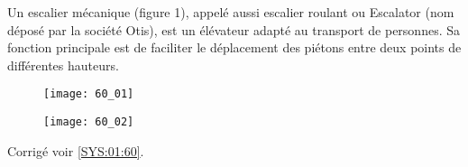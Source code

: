 \normaltrue \difficilefalse \tdifficilefalse
\correctionfalse

\setcounter{question}{0}

\ifcorrection
\else
{}
\fi

\ifprof
\else


Un escalier mécanique (figure 1), appelé aussi escalier roulant ou Escalator (nom déposé par la société Otis), est un élévateur adapté au transport de personnes. Sa fonction principale est de faciliter le déplacement des piétons entre deux points de différentes hauteurs. 



\begin{figure}[H]
\centering
\texttt{[image: 60\_01]}
\end{figure}

\begin{figure}[H]
\centering
\texttt{[image: 60\_02]}

\end{figure}
\fi




\ifprof
\else
\begin{flushright}
\footnotesize{Corrigé  voir \ref{SYS:01:60}.}
\end{flushright}%
\fi